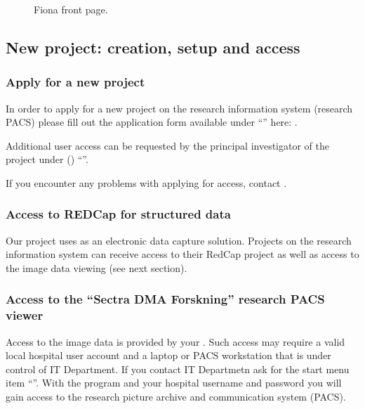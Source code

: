 \documentclass[letterpaper,10pt,english]{sphinxmanual}
\begin{document}
\begin{figure}[htbp]
\centering
\capstart

\noindent{}
\caption{Fiona front page.}\label{\detokenize{EndUser/index:id1}}\end{figure}


\subsection{New project: creation, setup and access}
\label{\detokenize{EndUser/index:new-project-creation-setup-and-access}}

\subsubsection{Apply for a new project}
\label{\detokenize{EndUser/index:apply-for-a-new-project}}
\sphinxAtStartPar
In order to apply for a new project on the research information system (research PACS)
please fill out the application form available under “”
here: .

\sphinxAtStartPar
Additional user access can be requested by the principal investigator of the project under
 () “”.

\sphinxAtStartPar
If you encounter any problems with applying for access, contact .


\subsubsection{Access to REDCap for structured data}
\label{\detokenize{EndUser/index:access-to-redcap-for-structured-data}}
\sphinxAtStartPar
Our project uses  as an electronic data capture solution. Projects on the research information system can receive access to their RedCap project as well as access to the image data viewing (see next section).


\subsubsection{Access to the “Sectra DMA Forskning” research PACS viewer}
\label{\detokenize{EndUser/index:access-to-the-sectra-dma-forskning-research-pacs-viewer}}
\sphinxAtStartPar
Access to the image data is provided by your . Such access may require a valid local hospital user account and a laptop or PACS workstation that is under control of IT Department. If you contact IT Departmetn ask for the start menu item “”. With the program and your hospital username and password you will gain access to the research picture archive and communication system (PACS).
\end{document}
